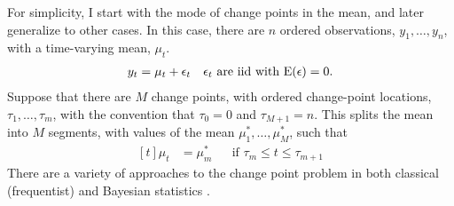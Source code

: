 For simplicity, I start with the mode of change points in the mean, and later generalize to other cases.
In this case, there are $n$ ordered observations, $y_{1}, \dots, y_{n}$, with a time-varying mean, $\mu_{t}$.
\begin{equation}
  \label{dlm:eq:17}
  \begin{aligned}[t]
    y_{t} & = \mu_{t} + \epsilon_{t} && \text{$\epsilon_{t}$ are iid with $\operatorname{E}(\epsilon) = 0$.} \\  
  \end{aligned}
\end{equation}
Suppose that there are $M$ change points, with ordered change-point locations, $\tau_{1}, \dots, \tau_{m}$, with the convention that $\tau_{0} = 0$ and $\tau_{M + 1} = n$.
This splits the mean into $M$ segments, with values of the mean $\mu^{*}_{1}, \dots, \mu^{*}_{M}$,  such that
\begin{equation}
  \label{dlm:eq:1}
  \begin{aligned}[t]
    \mu_{t} &= \mu^{*}_{m} && \text{if $\tau_{m} \leq t \leq \tau_{m + 1}$}
  \end{aligned}
\end{equation}
There are a variety of approaches to the change point problem in both classical (frequentist) \parencites{Page1954a}{Hinkley1970a}{BaiPerron2003a}{OlshenVenkatramanLucitoEtAl2004}{BaiPerron1998}{KillickFearnheadEckley2012} and Bayesian statistics \parencites{Yao1984}{BarryHartigan1993}{Chib1998}{Fearnhead2006a}{FearnheadLiu2007a}.

